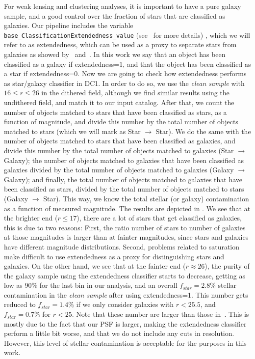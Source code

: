 \documentclass[twocolumn]{aastex62}
\begin{document}
For weak lensing and clustering analyses, it is important to have a pure galaxy sample, and a good control over the fraction of stars that are classified as galaxies. Our pipeline includes the variable \texttt{base\_ClassificationExtendedness\_value} (see~\citet{2018PASJ...70S...5B} for more details) , which we will refer to as extendedness, which can be used as a proxy to separate stars from galaxies as showed by~\citet{2018PASJ...70S..25M} and~\citet{2018PASJ...70S...5B}. In this work we say that an object has been classified as a galaxy if extendedness=1, and that the object has been classified as a star if extendedness=0. Now we are going to check how extendedness performs as star/galaxy classifier in DC1. In order to do so, we use the \textit{clean sample} with $16 \leq r \leq 26$ in the dithered field, although we find similar results using the undithered field, and match it to our input catalog. After that, we count the number of objects matched to stars that have been classified as stars, as a function of magnitude, and divide this number by the total number of objects matched to stars (which we will mark as Star $\rightarrow$ Star). We do the same with the number of objects matched to stars that have been classified as galaxies, and divide this number by the total number of objects matched to galaxies (Star $\rightarrow$ Galaxy); the number of objects matched to galaxies that have been classified as galaxies divided by the total number of objects matched to galaxies (Galaxy $\rightarrow$ Galaxy); and finally, the total number of objects matched to galaxies that have been classified as stars, divided by the total number of objects matched to stars (Galaxy $\rightarrow$ Star). This way, we know the total stellar (or galaxy) contamination as a function of measured magnitude. The results are depicted in . We see that at the brighter end ($r \leq 17$), there are a lot of stars that get classified as galaxies, this is due to two reasons: First, the ratio number of stars to number of galaxies at those magnitudes is larger than at fainter magnitudes, since stars and galaxies have different magnitude distributions. Second, problems related to saturation make difficult to use extendedness as a proxy for distinguishing stars and galaxies. On the other hand, we see that at the fainter end ($r \approx 26$), the purity of the galaxy sample using the extendedness classifier starts to decrease, getting as low as 90\% for the last bin in our analysis, and an overall $f_{star}=2.8\%$ stellar contamination in the \textit{clean sample} after using extendedness=1. This number gets reduced to $f_{star}=1.4\%$ if we only consider galaxies with $r < 25.5$, and $f_{star}=0.7\%$ for $r < 25$. Note that these number are larger than those in~\citet{2018PASJ...70S..25M}. This is mostly due to the fact that our PSF is larger, making the extendedness classifier perform a little bit worse, and that we do not include any cuts in resolution. However, this level of stellar contamination is acceptable for the purposes in this work.
\end{document}

